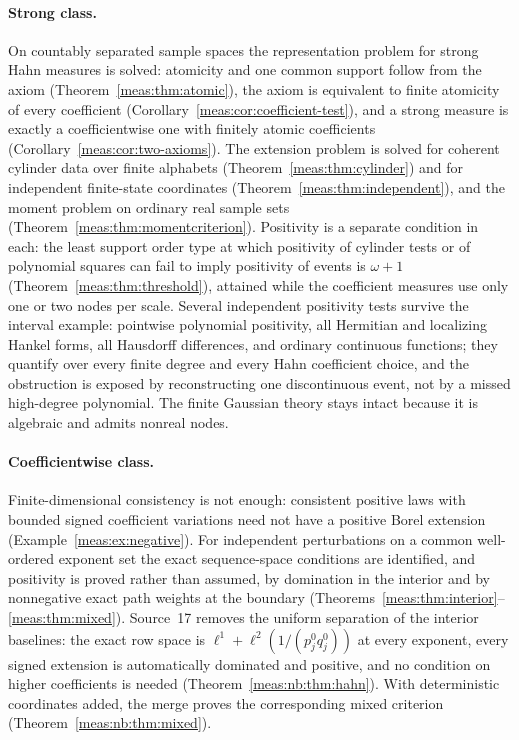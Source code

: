 \documentclass[11pt]{article}
\numberwithin{equation}{section}
\theoremstyle{definition}
\theoremstyle{remark}
\begin{document}
\paragraph{Strong class.} On countably separated sample spaces the representation
problem for strong Hahn measures is solved: atomicity and one common support
follow from the axiom (Theorem~\ref{meas:thm:atomic}), the axiom is equivalent to
finite atomicity of every coefficient (Corollary~\ref{meas:cor:coefficient-test}),
and a strong measure is exactly a coefficientwise one with finitely atomic
coefficients (Corollary~\ref{meas:cor:two-axioms}). The extension problem is solved
for coherent cylinder data over finite alphabets (Theorem~\ref{meas:thm:cylinder})
and for independent finite-state coordinates
(Theorem~\ref{meas:thm:independent}), and the moment problem on ordinary real sample
sets (Theorem~\ref{meas:thm:momentcriterion}). Positivity is a separate
condition in each: the least support order type at which positivity of cylinder
tests or of polynomial squares can fail to imply positivity of events is
$\omega+1$ (Theorem~\ref{meas:thm:threshold}), attained while the coefficient
measures use only one or two nodes per scale. Several independent positivity tests
survive the interval example: pointwise polynomial positivity, all Hermitian and
localizing Hankel forms, all Hausdorff differences, and ordinary continuous
functions; they quantify over every finite degree and every Hahn coefficient
choice, and the obstruction is exposed by reconstructing one discontinuous event,
not by a missed high-degree polynomial. The finite Gaussian theory stays intact
because it is algebraic and admits nonreal nodes.

\paragraph{Coefficientwise class.} Finite-dimensional consistency is not enough:
consistent positive laws with bounded signed coefficient variations need not have
a positive Borel extension (Example~\ref{meas:ex:negative}). For independent
perturbations on a common well-ordered exponent set the exact sequence-space
conditions are identified, and positivity is proved rather than assumed, by
domination in the interior and by nonnegative exact path weights at the
boundary (Theorems~\ref{meas:thm:interior}--\ref{meas:thm:mixed}). Source~17
removes the uniform separation of the interior baselines: the exact row space is
$\ell^1+\ell^2(1/(p_j^0q_j^0))$ at every exponent, every signed extension is
automatically dominated and positive, and no condition on higher coefficients is
needed (Theorem~\ref{meas:nb:thm:hahn}). With deterministic coordinates added, the
merge proves the corresponding mixed criterion (Theorem~\ref{meas:nb:thm:mixed}).
\end{document}
